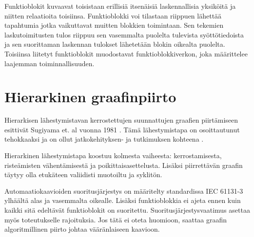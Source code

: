 \documentclass[finnish,12pt]{article}
\begin{document}
Funktioblokit kuvaavat toisistaan erillisiä itsenäisiä laskennallisia yksiköitä
ja niitten relaatioita toisiinsa. Funktioblokki voi tilastaan riippuen lähettää
tapahtumia jotka vaikuttavat muitten blokkien toimintaan. Sen tekemien
laskutoimitusten tulos riippuu sen vasemmalta puolelta tulevista
syöttötiedoista ja sen suorittaman laskennan tulokset lähetetään blokin oikealta puolelta.
Toisiinsa liitetyt funktioblokit muodostavat funktioblokkiverkon, joka määrittelee laajemman toiminnallisuuden.





	\clearpage
	\section{Hierarkinen graafinpiirto}

Hierarkisen lähestymistavan kerrostettujen suunnattujen graafien piirtämiseen
esittivät Sugiyama et. al vuonna 1981 \cite{RefWorks:9}. Tämä lähestymistapa on
osoittautunut tehokkaaksi ja on ollut jatkokehityksen- ja tutkimuksen kohteena
\cite{RefWorks:28}.

Hierarkinen lähestymistapa koostuu kolmesta vaiheesta: kerrostamisesta,
risteämisten vähentämisestä ja poikittaisasettelusta. Lisäksi piirrettävän
graafin täytyy olla etukäteen valiidisti muotoiltu ja syklitön.

Automaatiokaavioiden suoritusjärjestys on määritelty standardissa IEC 61131-3
ylhäältä alas ja vasemmalta oikealle. Lisäksi funktioblokkia ei ajeta ennen
kuin kaikki sitä edeltävät funktioblokit on suoritettu.
Suoritusjärjestysvaatimus asettaa myös toteutukselle rajoituksia. Jos tätä ei oteta
huomioon, saattaa graafin algoritmillinen piirto johtaa vääränlaiseen kaavioon.
\end{document}
